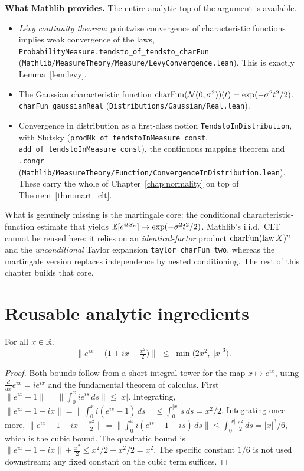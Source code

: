 \medskip

\textbf{What Mathlib provides.} The entire analytic top of the argument is
available.
\begin{itemize}
  \item \emph{L\'evy continuity theorem}: pointwise convergence of characteristic
        functions implies weak convergence of the laws,
        \texttt{ProbabilityMeasure.tendsto\_of\_tendsto\_charFun}
        (\texttt{Mathlib/MeasureTheory/Measure/LevyConvergence.lean}). This is
        exactly Lemma~\ref{lem:levy}.
  \item The Gaussian characteristic function
        $\operatorname{charFun}(\mathcal N(0,\sigma^2))(t)=\exp(-\sigma^2 t^2/2)$,
        \texttt{charFun\_gaussianReal}
        (\texttt{Distributions/Gaussian/Real.lean}).
  \item Convergence in distribution as a first-class notion
        \texttt{TendstoInDistribution}, with Slutsky
        (\texttt{prodMk\_of\_tendstoInMeasure\_const},
        \texttt{add\_of\_tendstoInMeasure\_const}), the continuous mapping theorem
        and \texttt{.congr}
        (\texttt{Mathlib/MeasureTheory/Function/ConvergenceInDistribution.lean}).
        These carry the whole of Chapter~\ref{chap:normality} on top of
        Theorem~\ref{thm:mart_clt}.
\end{itemize}
What is genuinely missing is the martingale core: the conditional
characteristic-function estimate that yields
$\mathbb{E}[e^{itS_n}]\to\exp(-\sigma^2 t^2/2)$. Mathlib's i.i.d.\ CLT cannot be reused
here: it relies on an \emph{identical-factor} product $\operatorname{charFun}(\mathrm{law}\,X)^n$
and the \emph{unconditional} Taylor expansion \texttt{taylor\_charFun\_two},
whereas the martingale version replaces independence by nested conditioning. The
rest of this chapter builds that core.

\section{Reusable analytic ingredients}
\label{sec:pre_clt_analytic}

\begin{lemma}\label{lem:clt_exp_bound}
\leanok
For all $x\in\mathbb{R}$,
\[
  \Big\| e^{ix} - \big(1 + ix - \tfrac{x^2}{2}\big)\Big\|
  \;\le\; \min\!\big(2x^2,\ |x|^3\big).
\]
\end{lemma}

\begin{proof}\leanok
Both bounds follow from a short integral tower for the map $x\mapsto e^{ix}$,
using $\tfrac{d}{dx}e^{ix}=ie^{ix}$ and the fundamental theorem of calculus.
First $\|e^{ix}-1\|=\|\int_0^x i e^{is}\,ds\|\le|x|$. Integrating,
$\|e^{ix}-1-ix\|=\|\int_0^x i(e^{is}-1)\,ds\|\le\int_0^{|x|}s\,ds=x^2/2$.
Integrating once more,
$\|e^{ix}-1-ix+\tfrac{x^2}{2}\|=\|\int_0^x i(e^{is}-1-is)\,ds\|
\le\int_0^{|x|}\tfrac{s^2}{2}\,ds=|x|^3/6$, which is the cubic bound. The
quadratic bound is $\|e^{ix}-1-ix\|+\tfrac{x^2}{2}\le x^2/2+x^2/2=x^2$.
The specific constant $1/6$ is not used downstream; any fixed constant on the
cubic term suffices.
\end{proof}

